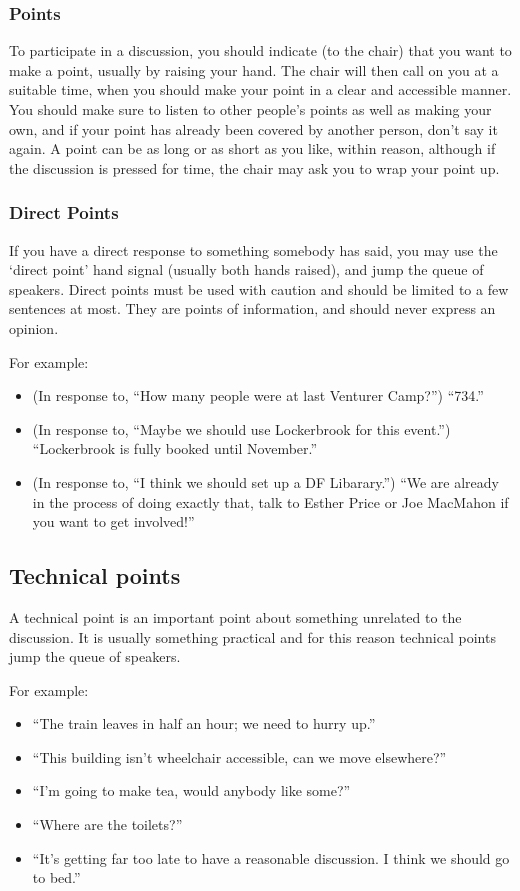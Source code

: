 \documentclass[a4paper, 11pt]{article} %
\begin{document}
\subsubsection{Points}
To participate in a discussion, you should indicate (to the chair) that you want to make a point, usually by raising your hand.  The chair will then call on you at a suitable time, when you should make your point in a clear and accessible manner.  You should make sure to listen to other people's points as well as making your own, and if your point has already been covered by another person, don't say it again.  A point can be as long or as short as you like, within reason, although if the discussion is pressed for time, the chair may ask you to wrap your point up.

\subsubsection{Direct Points}
If you have a direct response to something somebody has said, you may use the `direct point' hand signal (usually both hands raised), and jump the queue of speakers. Direct points must be used with caution and should be limited to a few sentences at most. They are points of information, and should never express an opinion.

For example:
\begin{itemize}
\item (In response to, ``How many people were at last Venturer Camp?'') ``734.''
\item (In response to, ``Maybe we should use Lockerbrook for this event.'') ``Lockerbrook is fully booked until November.''
\item (In response to, ``I think we should set up a DF Libarary.'') ``We are already in the process of doing exactly that, talk to Esther Price or Joe MacMahon if you want to get involved!''
\end{itemize}

\subsection{Technical points}
A technical point is an important point about something unrelated to the discussion.  It is usually something practical and for this reason technical points jump the queue of speakers.

For example:
\begin{itemize}
\item ``The train leaves in half an hour; we need to hurry up.''
\item ``This building isn't wheelchair accessible, can we move elsewhere?''
\item ``I'm going to make tea, would anybody like some?''
\item ``Where are the toilets?''
\item ``It's getting far too late to have a reasonable discussion.  I think we should go to bed.''
\end{itemize}
\end{document}
